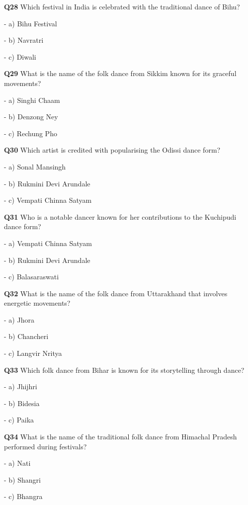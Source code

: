 \textbf{Q28} Which festival in India is celebrated with the traditional dance of Bihu?\par
\quad - a) Bihu Festival\par
\quad - b) Navratri\par
\quad - c) Diwali\par

\textbf{Q29} What is the name of the folk dance from Sikkim known for its graceful movements?\par
\quad - a) Singhi Chaam\par
\quad - b) Denzong Ney\par
\quad - c) Rechung Pho\par

\textbf{Q30} Which artist is credited with popularising the Odissi dance form?\par
\quad - a) Sonal Mansingh\par
\quad - b) Rukmini Devi Arundale\par
\quad - c) Vempati Chinna Satyam\par

\textbf{Q31} Who is a notable dancer known for her contributions to the Kuchipudi dance form?\par
\quad - a) Vempati Chinna Satyam\par
\quad - b) Rukmini Devi Arundale\par
\quad - c) Balasaraswati\par

\textbf{Q32} What is the name of the folk dance from Uttarakhand that involves energetic movements?\par
\quad - a) Jhora\par
\quad - b) Chancheri\par
\quad - c) Langvir Nritya\par

\textbf{Q33} Which folk dance from Bihar is known for its storytelling through dance?\par
\quad - a) Jhijhri\par
\quad - b) Bidesia\par
\quad - c) Paika\par

\textbf{Q34} What is the name of the traditional folk dance from Himachal Pradesh performed during festivals?\par
\quad - a) Nati\par
\quad - b) Shangri\par
\quad - c) Bhangra\par

